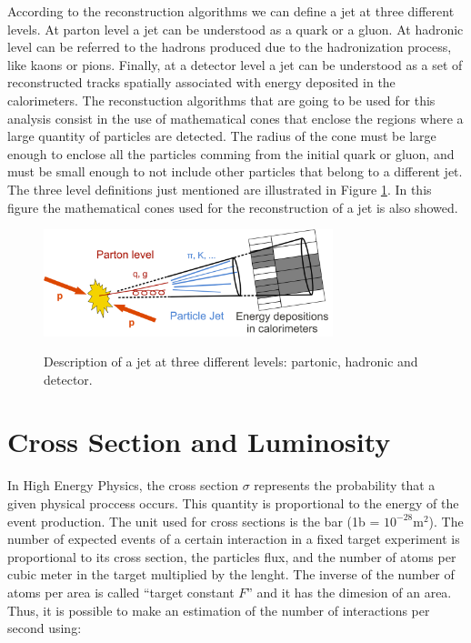  According to the reconstruction algorithms we can define a jet at three different levels. At parton level a jet can be understood as a quark or a gluon. At hadronic level can be referred to the
 hadrons produced due to the hadronization process, like kaons or pions. Finally, at a detector level a jet can be understood as a set of reconstructed tracks spatially associated with energy 
 deposited in the calorimeters. The reconstuction algorithms that are going to be used for this analysis consist in the use of mathematical cones that enclose the regions where a large quantity
 of particles are 
 detected. The radius of the cone must be large enough to enclose all the particles comming from the initial quark or gluon, and must be small enough to not include other particles that belong to a 
 different jet. The three level definitions just mentioned are illustrated in Figure \ref{Jets_definitions}. In this figure the mathematical cones used for the reconstruction of a jet is also showed.
 
 
 \begin{figure}[h] 
 \centering
 \caption{Description of a jet at three different levels: partonic, hadronic and detector.}
 \includegraphics[width=0.75\textwidth]{./Capitulos/VariableDefinitions/jets_definitions}  
 \label{Jets_definitions}
 \end{figure}
 
 \section{Cross Section and Luminosity}
 
 In High Energy Physics, the cross section $\sigma$ represents the probability that a given physical proccess occurs. This quantity is proportional to the energy of the event production. The unit 
 used for cross sections is the bar (1b = $10^{-28} \text{m}^2$). The number of expected events of a certain interaction in a fixed target experiment is proportional to its cross section, the particles flux, and the
 number of atoms per cubic meter in the target multiplied by the lenght. The inverse of the number of atoms per area is called ``target constant $F$'' and it has the dimesion of an area. Thus, it 
 is possible to make an estimation of the number of interactions per second using:
 
